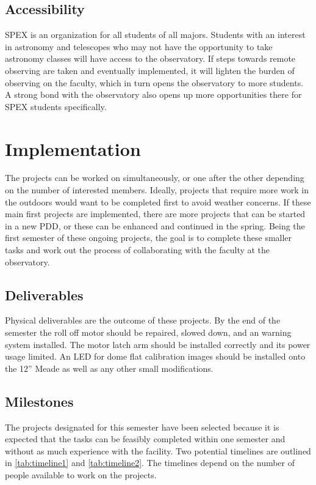 \documentclass[conference]{IEEEtran} %
\begin{document}
\subsection{Accessibility}
\label{subsec:plug-n-play}
SPEX is an organization for all students of all majors.
Students with an interest in astronomy and telescopes who may not have the opportunity to take astronomy classes will have access to the observatory.
If steps towards remote observing are taken and eventually implemented, it will lighten the burden of observing on the faculty, which in turn opens the observatory to more students.
A strong bond with the observatory also opens up more opportunities there for SPEX students specifically.

\section{Implementation}
\label{sec:implementation}

 The projects can be worked on simultaneously, or one after the other depending on the number of interested members.
 Ideally, projects that require more work in the outdoors would want to be completed first to avoid weather concerns.
 If these main first projects are implemented, there are more projects that can be started in a new PDD, or these can be enhanced and continued in the spring.
 Being the first semester of these ongoing projects, the goal is to complete these smaller tasks and work out the process of collaborating with the faculty at the observatory.

\subsection{Deliverables}
\label{subsec:deliverables}
  Physical deliverables are the outcome of these projects.
  By the end of the semester the roll off motor should be repaired, slowed down, and an warning system installed.
  The motor latch arm should be installed correctly and its power usage limited.
  An LED for dome flat calibration images should be installed onto the 12'' Meade as well as any other small modifications.

\subsection{Milestones}
\label{subsec:milestones}
  The projects designated for this semester have been selected because it is expected that the tasks can be feasibly completed within one semester and without as much experience with the facility.
  Two potential timelines are outlined in \autoref{tab:timeline1} and \autoref{tab:timeline2}.
  The timelines depend on the number of people available to work on the projects.
\end{document}
